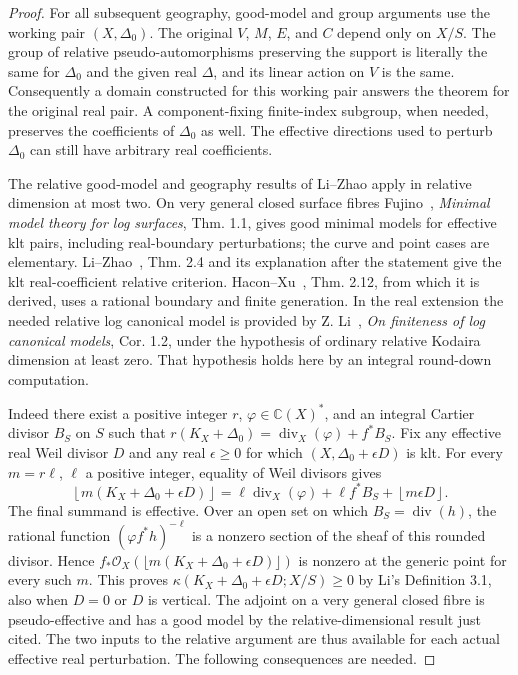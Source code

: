 \documentclass[11pt]{article}
\begin{document}
\begin{proof}
For all subsequent geography, good-model and group arguments use the working pair \((X,\Delta_0)\). The
original \(V\), \(M\), \(E\), and \(C\) depend only on \(X/S\). The group of relative
pseudo-automorphisms preserving the support is literally the same for \(\Delta_0\) and the given real
\(\Delta\), and its linear action on \(V\) is the same. Consequently a domain constructed for this
working pair answers the theorem for the original real pair. A component-fixing finite-index subgroup,
when needed, preserves the coefficients of \(\Delta_0\) as well. The effective directions used to perturb
\(\Delta_0\) can still have arbitrary real coefficients.

The relative good-model and geography results of Li--Zhao apply in relative dimension at most two. On
very general closed surface fibres Fujino~\cite{Fujino}, \emph{Minimal model theory for log surfaces},
Thm. 1.1, gives good minimal models for effective klt pairs, including real-boundary perturbations; the
curve and point cases are elementary. Li--Zhao~\cite{LiZhao}, Thm. 2.4 and its explanation after the
statement give the klt real-coefficient relative criterion. Hacon--Xu~\cite{HaconXuGood}, Thm. 2.12, from
which it is derived, uses a rational boundary and finite generation. In the real extension the needed
relative log canonical model is provided by Z. Li~\cite{LiFiniteness}, \emph{On finiteness of log
canonical models}, Cor. 1.2, under the hypothesis of ordinary relative Kodaira dimension at
least zero. That hypothesis holds here by an integral round-down computation.

Indeed there exist a positive integer \(r\), \(\varphi\in\mathbb C(X)^*\), and an integral Cartier divisor \(B_S\) on \(S\) such that \(r(K_X+\Delta_0)=\operatorname{div}_X(\varphi)+f^*B_S\). Fix any effective real Weil divisor \(D\) and any real \(\epsilon\ge0\) for which \((X,\Delta_0+\epsilon D)\) is klt. For every \(m=r\ell\), \(\ell\) a positive integer, equality of Weil divisors gives \[
 \left\lfloor m(K_X+\Delta_0+\epsilon D)\right\rfloor
 =\ell\operatorname{div}_X(\varphi)+\ell f^*B_S+
   \left\lfloor m\epsilon D\right\rfloor .
\] The final summand is effective. Over an open set on which \(B_S=\operatorname{div}(h)\), the rational function \((\varphi f^*h)^{-\ell}\) is a nonzero section of the sheaf of this rounded divisor. Hence \(f_*\mathcal O_X(\lfloor m(K_X+\Delta_0+\epsilon D)\rfloor)\) is nonzero at the generic point for every such \(m\). This proves \(\kappa(K_X+\Delta_0+\epsilon D;X/S)\ge0\) by Li's Definition 3.1, also when \(D=0\) or \(D\) is vertical. The adjoint on a very general closed fibre is pseudo-effective and has a good model by the relative-dimensional result just cited. The two inputs to the relative argument are thus available for each actual effective real perturbation. The following consequences are needed.




\end{proof}
\end{document}
